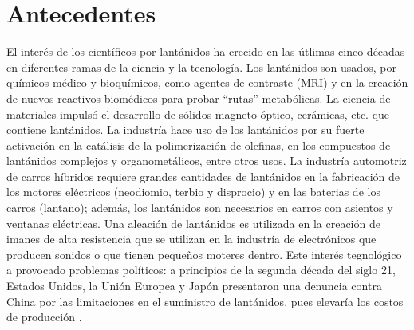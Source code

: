 \section{Antecedentes}
El inter\'es de los cient\'ificos por lant\'anidos ha crecido en las
\'utlimas cinco d\'ecadas en diferentes ramas de la ciencia y la 
tecnolog\'ia. Los lant\'anidos son usados, por qu\'imicos m\'edico
y bioqu\'imicos, como agentes de contraste (MRI) y en la creaci\'on 
de nuevos reactivos biom\'edicos para probar ``rutas'' metab\'olicas.
La ciencia de materiales impuls\'o el desarrollo de s\'olidos 
magneto-\'optico, cer\'amicas, etc. que contiene lant\'anidos. La
industr\'ia hace uso de los lant\'anidos por su fuerte activaci\'on
en la cat\'alisis de la polimerizaci\'on de olefinas, en los
compuestos de lant\'anidos complejos y organomet\'alicos, entre otros
usos. La industr\'ia automotriz de carros h\'ibridos requiere grandes
cantidades de lant\'anidos en la fabricaci\'on de los motores 
el\'ectricos (neodiomio, terbio y disprocio) y en las baterias de los
carros (lantano); adem\'as, los lant\'anidos son necesarios en carros
con asientos y ventanas el\'ectricas. Una aleaci\'on de lant\'anidos 
es utilizada en la creaci\'on de imanes de alta resistencia que se 
utilizan en la industr\'ia de electr\'onicos que producen sonidos o 
que tienen peque\~nos moteres dentro. Este inter\'es tegnol\'ogico a
provocado problemas pol\'iticos: a principios de la segunda
d\'ecada del siglo 21, Estados Unidos, la Uni\'on Europea y Jap\'on 
presentaron una denuncia contra China por las limitaciones en el 
suministro de lant\'anidos, pues elevar\'ia los costos de 
producci\'on \citep{Ciup2010,Kuta2010,Jesk1985,Rao1989}.

